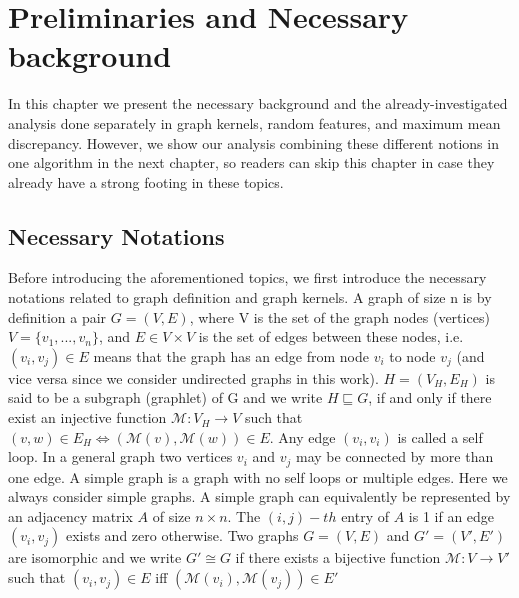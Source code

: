 \chapter{Preliminaries and Necessary background}
\label{chapter:background}
In this chapter we present the necessary background and the already-investigated analysis done separately in graph kernels, random features, and maximum mean discrepancy. However, we show our analysis combining these different notions in one algorithm in the next chapter, so readers can skip this chapter in case they already have a strong footing in these topics.

\section{Necessary Notations}
Before introducing the aforementioned topics, we first introduce the necessary notations related to graph definition and graph kernels.
A graph of size n is by definition a pair $G=(V,E)$, where V is the set of the graph nodes (vertices) $V=\{v_1,...,v_n\}$, and $E\in V\times V$ is the set of edges between these nodes, i.e. $(v_i, v_j)\in E$ means that the graph has an edge from node $v_i$ to node $v_j$ (and vice versa since we consider undirected graphs in this work).
\newline $H=(V_H,E_H)$ is said to be a subgraph (graphlet) of G and we write $H\sqsubseteq G$, if and only if there exist an injective function $\mathcal{M}:V_H\xrightarrow{} V$ such that $(v,w)\in E_H \Leftrightarrow{(\mathcal{M}(v),\mathcal{M}(w))\in E}$.\newline
Any edge $(v_i, v_i)$ is called a self loop. In a general graph two vertices $v_i$ and $v_j$ may be connected by more than
one edge. A simple graph is a graph with no self loops
or multiple edges. Here we always consider simple graphs.\newline
A simple graph can equivalently be represented by an adjacency matrix $A$ of size $n \times n$. The $(i,j)-th$ entry of $A$ is 1 if an edge $(v_i, v_j)$ exists and zero otherwise.\newline
Two graphs $G=(V,E)$ and $G'=(V',E')$ are isomorphic and we write $G'\cong G$ if there exists a bijective function $\mathcal{M}:V\xrightarrow{} V'$ such that $(v_i,v_j)\in E$ iff $(\mathcal{M}(v_i),\mathcal{M}(v_j))\in E'$



